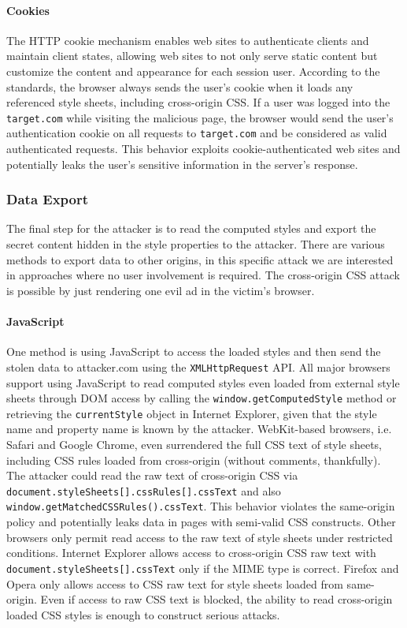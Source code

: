 \documentclass{acm_proc_article-sp}
\begin{document}
{\paragraph{Cookies}
The HTTP cookie mechanism enables web sites to authenticate clients and maintain client states, allowing web sites to not only serve static content but customize the content and appearance for each session user. According to the standards, the browser always sends the user's cookie when it loads any referenced style sheets, including cross-origin CSS. If a user was logged into the \texttt{target.com} while visiting the malicious page, the browser would send the user's authentication cookie on all requests to \texttt{target.com} and be considered as valid authenticated requests. This behavior exploits cookie-authenticated web sites and potentially leaks the user's sensitive information in the server's response. 

\subsubsection{Data Export}
The final step for the attacker is to read the computed styles and export the secret content hidden in the style properties to the attacker. There are various methods to export data to other origins, in this specific attack we are interested in approaches where no user involvement is required. The cross-origin CSS attack is possible by just rendering one evil ad in the victim's browser. 

\paragraph{JavaScript}
One method is using JavaScript to access the loaded styles and then send the stolen data to attacker.com using the \texttt{XMLHttpRequest} API. All major browsers support using JavaScript to read computed styles even loaded from external style sheets through DOM access by calling the \texttt{window.getComputedStyle} method or retrieving the \texttt{currentStyle} object in Internet Explorer, given that the style name and property name is known by the attacker. WebKit-based browsers, i.e. Safari and Google Chrome, even surrendered the full CSS text of style sheets, including CSS rules loaded from cross-origin (without comments, thankfully). The attacker could read the raw text of cross-origin CSS via \texttt{document.styleSheets[].cssRules[].cssText} and also \texttt{window.getMatchedCSSRules().cssText}. This behavior violates the same-origin policy and potentially leaks data in pages with semi-valid CSS constructs. Other browsers only permit read access to the raw text of style sheets under restricted conditions. Internet Explorer allows access to cross-origin CSS raw text with \texttt{document.styleSheets[].cssText} only if the MIME type is correct. Firefox and Opera only allows access to CSS raw text for style sheets loaded from same-origin. Even if access to raw CSS text is blocked, the ability to read cross-origin loaded CSS styles is enough to construct serious attacks.

}
\end{document}
